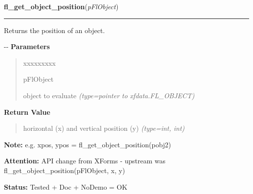 \hspace{.8\funcindent}\begin{boxedminipage}{\funcwidth}

    \raggedright \textbf{fl\_get\_object\_position}(\textit{pFlObject})

    \vspace{-1.5ex}

    \rule{\textwidth}{0.5\fboxrule}
\setlength{\parskip}{2ex}

Returns the position of an object.

-{}-
\setlength{\parskip}{1ex}
      \textbf{Parameters}
      \vspace{-1ex}

      \begin{quote}
        \begin{Ventry}{xxxxxxxxx}

          \item[pFlObject]


object to evaluate
            {\it (type=pointer to xfdata.FL\_OBJECT)}

        \end{Ventry}

      \end{quote}

      \textbf{Return Value}
    \vspace{-1ex}

      \begin{quote}

horizontal (x) and vertical position (y)
      {\it (type=int, int)}

      \end{quote}

\textbf{Note:} 
e.g. xpos, ypos = fl\_get\_object\_position(pobj2)


\textbf{Attention:} 
API change from XForms - upstream was
fl\_get\_object\_position(pFlObject, x, y)


\textbf{Status:} 
Tested + Doc + NoDemo = OK


    \end{boxedminipage}

    \label{xformslib:flbasic:fl_get_object_bbox}

    \vspace{0.5ex}

